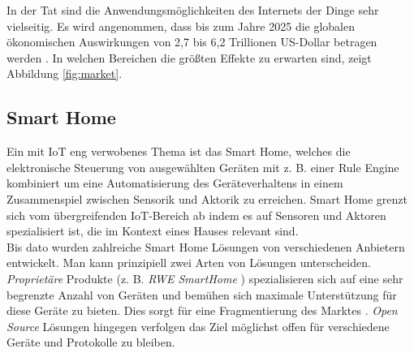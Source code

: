 In der Tat sind die Anwendungsmöglichkeiten des Internets der Dinge sehr vielseitig. Es wird angenommen, dass bis zum Jahre 2025 die globalen ökonomischen Auswirkungen von 2,7 bis 6,2 Trillionen US-Dollar betragen werden \cite{money}. In welchen Bereichen die größten Effekte zu erwarten sind, zeigt Abbildung \ref{fig:market}.





\subsection{Smart Home}
Ein mit IoT eng verwobenes Thema ist das Smart Home\cite{SmartHomeIoT}, welches die elektronische Steuerung von ausgewählten Geräten mit z. B. einer Rule Engine kombiniert um eine Automatisierung des Geräteverhaltens in einem Zusammenspiel zwischen Sensorik und Aktorik zu erreichen. Smart Home grenzt sich vom übergreifenden IoT-Bereich ab indem es auf Sensoren und Aktoren spezialisiert ist, die im Kontext eines Hauses relevant sind.\\

Bis dato wurden zahlreiche Smart Home Lösungen von verschiedenen Anbietern entwickelt. Man kann prinzipiell zwei Arten von Lösungen unterscheiden. \textit{Proprietäre} Produkte (z. B. \textit{RWE SmartHome} \cite{RWE}) spezialisieren sich auf eine sehr begrenzte Anzahl von Geräten und bemühen sich maximale Unterstützung für diese Geräte zu bieten. Dies sorgt für eine Fragmentierung des Marktes \cite{sh:fragment}. \textit{Open Source} Lösungen hingegen verfolgen das Ziel möglichst offen für verschiedene Geräte und Protokolle zu bleiben.\\ 

